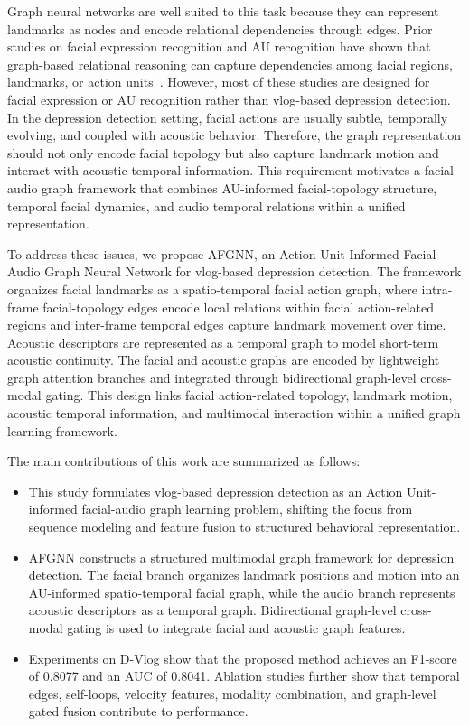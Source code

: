 \documentclass[conference]{IEEEtran}
\begin{document}
Graph neural networks are well suited to this task because they can represent landmarks as nodes and encode relational dependencies through edges.
Prior studies on facial expression recognition and AU recognition have shown that graph-based relational reasoning can capture dependencies among facial regions, landmarks, or action units~\cite{song2021uncertain,ge2024mgrr,liao2022fergcn}. However, most of these studies are designed for facial expression or AU recognition rather than vlog-based depression detection. In the depression detection setting, facial actions are usually subtle, temporally evolving, and coupled with acoustic behavior. Therefore, the graph representation should not only encode facial topology but also capture landmark motion and interact with acoustic temporal information.
This requirement motivates a facial-audio graph framework that combines AU-informed facial-topology structure, temporal facial dynamics, and audio temporal relations within a unified representation.


To address these issues, we propose AFGNN, an Action Unit-Informed Facial-Audio Graph Neural Network for vlog-based depression detection. The framework organizes facial landmarks as a spatio-temporal facial action graph, where intra-frame facial-topology edges encode local relations within facial action-related regions and inter-frame temporal edges capture landmark movement over time. Acoustic descriptors are represented as a temporal graph to model short-term acoustic continuity. The facial and acoustic graphs are encoded by lightweight graph attention branches and integrated through bidirectional graph-level cross-modal gating. This design links facial action-related topology, landmark motion, acoustic temporal information, and multimodal interaction within a unified graph learning framework.

The main contributions of this work are summarized as follows:
\begin{itemize}
\item This study formulates vlog-based depression detection as an Action Unit-informed facial-audio graph learning problem, shifting the focus from sequence modeling and feature fusion to structured behavioral representation.


\item AFGNN constructs a structured multimodal graph framework for depression detection. The facial branch organizes landmark positions and motion into an AU-informed spatio-temporal facial graph, while the audio branch represents acoustic descriptors as a temporal graph. Bidirectional graph-level cross-modal gating is used to integrate facial and acoustic graph features.



\item Experiments on D-Vlog show that the proposed method achieves an F1-score of 0.8077 and an AUC of 0.8041. Ablation studies further show that temporal edges, self-loops, velocity features, modality combination, and graph-level gated fusion contribute to performance. 
\end{itemize}
\end{document}
